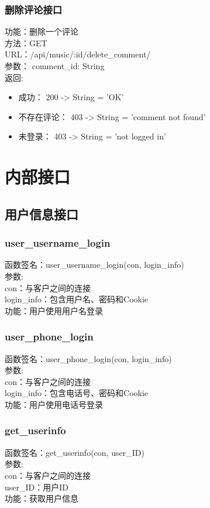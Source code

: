 \subsubsection{删除评论接口}

\noindent
功能：删除一个评论\\
方法：GET\\
URL：/api/music/:id/delete\_comment/\\
参数： comment\_id: String\\
返回:
\begin{itemize}
	\item 成功： 200 -> String = 'OK'
	\item 不存在评论： 403 -> String = 'comment not found'
	\item 未登录： 403 -> String = 'not logged in'
\end{itemize}


\section{内部接口}

\subsection{用户信息接口}

\subsubsection{user\_username\_login}
\noindent
函数签名：user\_username\_login(con, login\_info)\\
参数:\\
con：与客户之间的连接\\
login\_info：包含用户名、密码和Cookie\\
功能：用户使用用户名登录

\subsubsection{user\_phone\_login}
\noindent
函数签名：user\_phone\_login(con, login\_info)\\
参数:\\
con：与客户之间的连接\\
login\_info：包含电话号、密码和Cookie\\
功能：用户使用电话号登录

\subsubsection{get\_userinfo}
\noindent
函数签名：get\_userinfo(con, user\_ID)\\
参数:\\
con：与客户之间的连接\\
user\_ID：用户ID\\
功能：获取用户信息

